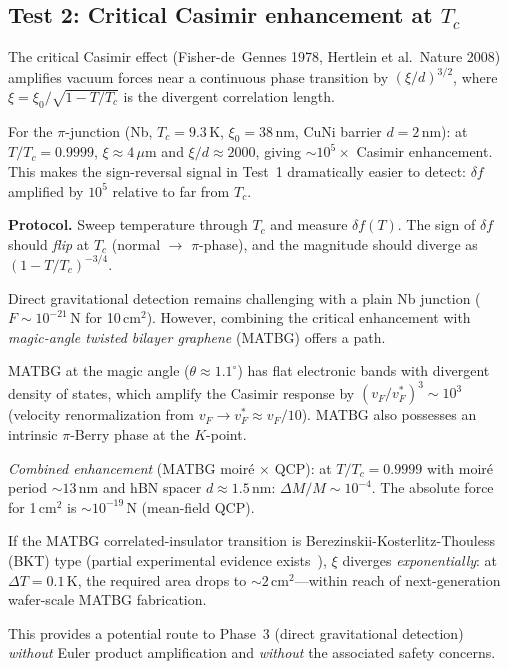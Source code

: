 \documentclass[aps,prl,twocolumn,superscriptaddress,nofootinbib]{revtex4-2}
\begin{document}
\subsection{Test 2: Critical Casimir enhancement at $T_c$}

The critical Casimir effect (Fisher-de~Gennes 1978,
Hertlein et al.\ Nature 2008) amplifies vacuum forces
near a continuous phase transition by $({\xi}/{d})^{3/2}$,
where $\xi = \xi_0 / \sqrt{1 - T/T_c}$ is the divergent
correlation length.

For the $\pi$-junction (Nb, $T_c = 9.3$\,K, $\xi_0 = 38$\,nm,
CuNi barrier $d = 2$\,nm):
at $T/T_c = 0.9999$, $\xi \approx 4\,\mu$m and $\xi/d \approx 2000$,
giving $\sim 10^5 \times$ Casimir enhancement.
This makes the sign-reversal signal in Test~1 dramatically easier
to detect: $\delta f$ amplified by $10^5$ relative to far from $T_c$.

\textbf{Protocol.} Sweep temperature through $T_c$ and measure
$\delta f(T)$. The sign of $\delta f$ should \emph{flip} at $T_c$
(normal $\to$ $\pi$-phase), and the magnitude should diverge as
$(1 - T/T_c)^{-3/4}$.

Direct gravitational detection remains challenging with a plain
Nb junction ($F \sim 10^{-21}$\,N for 10\,cm$^2$).
However, combining the critical enhancement with
\emph{magic-angle twisted bilayer graphene} (MATBG) offers a path.

MATBG at the magic angle ($\theta \approx 1.1^\circ$) has
flat electronic bands with divergent density of states,
which amplify the Casimir response by $(v_F/v_F^*)^3 \sim 10^3$
(velocity renormalization from $v_F \to v_F^* \approx v_F/10$).
MATBG also possesses an intrinsic $\pi$-Berry phase at the $K$-point.

\emph{Combined enhancement} (MATBG moir\'e $\times$ QCP):
at $T/T_c = 0.9999$ with moir\'e period $\sim 13$\,nm and
hBN spacer $d \approx 1.5$\,nm:
$\Delta M / M \sim 10^{-4}$.
The absolute force for 1\,cm$^2$ is $\sim 10^{-19}$\,N
(mean-field QCP).

If the MATBG correlated-insulator transition is
Berezinskii-Kosterlitz-Thouless (BKT) type
(partial experimental evidence exists~\cite{Cao2020}),
$\xi$ diverges \emph{exponentially}: at $\Delta T = 0.1$\,K,
the required area drops to $\sim 2$\,cm$^2$---within reach
of next-generation wafer-scale MATBG fabrication.

This provides a potential route to Phase~3 (direct gravitational
detection) \emph{without} Euler product amplification and
\emph{without} the associated safety concerns.
\end{document}

